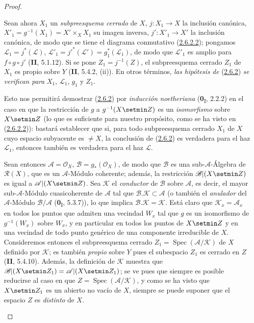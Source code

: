 \begin{proof}
\begin{env}[2.6.2.3]
\label{III.2.6.2.3-fr}
Sean ahora $X_1$ un \emph{subpreesquema cerrado} de $X$,
$j:X_1\to X$ la inclusión canónica,
$X'_1=g^{-1}(X_1)=X'\times_X X_1$ su imagen inversa,
$j':X'_1\to X'$ la inclusión canónica, de modo que se tiene el diagrama
conmutativo (\hyperref[III.2.6.2.2-fr]{2.6.2.2}); pongamos
$\mathcal L_1=j^*(\mathcal L)$,
$\mathcal L'_1=j'^*(\mathcal L')=g_1^*(\mathcal L_1)$, de modo que
$\mathcal L'_1$ es amplio para $f\circ g\circ j'$ (\textbf{II}, 5.1.12). Si se
pone $Z_1=j^{-1}(Z)$, el subpreesquema cerrado $Z_1$ de $X_1$ es propio
sobre $Y$ (\textbf{II}, 5.4.2, (ii)). En otros términos, \emph{las hipótesis de}
(\hyperref[III.2.6.2-fr]{2.6.2}) \emph{se verifican para} $X_1$,
$\mathcal L_1$, $g_1$ y $Z_1$.
\end{env}

Esto nos permitirá demostrar
(\hyperref[III.2.6.2-fr]{2.6.2}) por \emph{inducción noetheriana}
(\textbf{0}\textsubscript{I}, 2.2.2) en el caso en que la restricción de $g$ a
$g^{-1}(X\setmin Z)$ es un \emph{isomorfismo} sobre $X\setmin Z$ (lo que es suficiente para
nuestro propósito, como se ha visto en
(\hyperref[III.2.6.2.2-fr]{2.6.2.2})): bastará establecer que si, para
todo subpreesquema cerrado $X_1$ de $X$ cuyo espacio subyacente es
$\neq X$, la conclusión de (\hyperref[III.2.6.2-fr]{2.6.2}) es verdadera
para el haz $\mathcal L_1$, entonces también es verdadera para el
haz $\mathcal L$.

\begin{env}[2.6.2.4]
\label{III.2.6.2.4-fr}
Sean entonces $\mathcal A=\mathcal O_X$, $\mathcal B=g_*(\mathcal O_X)$,
de modo que $\mathcal B$ es una sub-$\mathcal A$-Álgebra de
$\mathcal R(X)$, que es un $\mathcal A$-Módulo coherente; además, la
restricción $\mathcal B|(X\setmin Z)$ es igual a $\mathcal A|(X\setmin Z)$. Sea
$\mathcal K$ el \emph{conductor} de $\mathcal B$ sobre $\mathcal A$, es decir,
el mayor sub-$\mathcal A$-Módulo cuasicoherente de $\mathcal A$ tal
que $\mathcal B.\mathcal K\subset\mathcal A$ (o también el \emph{anulador} del
$\mathcal A$-Módulo $\mathcal B/\mathcal A$
(\textbf{0}\textsubscript{I}, 5.3.7)), lo que implica
$\mathcal B.\mathcal K=\mathcal K$. Está claro que
$\mathcal K_x=\mathcal A_x$ en todos los puntos que admiten una vecindad
$W_x$ tal que $g$ es un isomorfismo de $g^{-1}(W_x)$ sobre $W_x$, y en
particular en todos los puntos de $X\setmin Z$ y en una vecindad de todo
punto genérico de una componente irreducible de $X$. Consideremos entonces
el subpreesquema cerrado $Z_1=\operatorname{Spec}(\mathcal A/\mathcal K)$
de $X$ definido por $\mathcal K$; es también \emph{propio} sobre $Y$ pues el
subespacio $Z_1$ es cerrado en $Z$ (\textbf{II}, 5.4.10). Además, la definición
de $\mathcal K$ muestra que
$\mathcal B|(X\setmin Z_1)=\mathcal A|(X\setmin Z_1)$; se ve pues que siempre es posible
reducirse al caso en que
$Z=\operatorname{Spec}(\mathcal A/\mathcal K)$, y como se ha visto que
$X\setmin Z_1$ es un abierto no vacío de $X$, siempre se puede suponer que
el espacio $Z$ es \emph{distinto} de $X$.
\end{env}


\end{proof}
